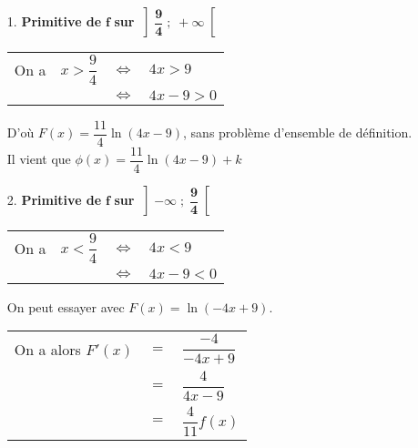 \begin{itemize}
\item[1.] \textbf{Primitive de} $\mathbf{f}$ \textbf{sur} $\mathbf{\left]\dfrac{9}{4} \; ; \; +\infty\right[}$ \\

\begin{tabular}{llll}
\hspace*{-.3cm} On a & $x > \dfrac{9}{4}$ & $\Longleftrightarrow$ & $4x > 9$ \vspace*{.3cm} \\
& & $\Longleftrightarrow$ & $4x - 9 > 0$ \vspace*{.3cm} \\
\end{tabular}

D'où $F(x) = \dfrac{11}{4}\ln\left(4x-9\right)$, sans problème d'ensemble de définition. \\

Il vient que $\phi\left(x\right) = \dfrac{11}{4}\ln\left(4x-9\right) + k$ \\

\item[2.] \textbf{Primitive de} $\mathbf{f}$ \textbf{sur} $\mathbf{\left]-\infty \; ; \; \dfrac{9}{4}\right[}$ \\

\begin{tabular}{llll}
\hspace*{-.3cm} On a & $x < \dfrac{9}{4}$ & $\Longleftrightarrow$ & $4x < 9$ \vspace*{.3cm} \\
& & $\Longleftrightarrow$ & $4x - 9 < 0$ \vspace*{.3cm} \\
\end{tabular}

On peut essayer avec $F(x) = \ln\left(-4x+9\right)$. \\

\begin{tabular}{lll}
\hspace*{-.3cm} On a alors $F'(x)$ & $=$ & $ \dfrac{-4}{-4x+9}$ \vspace*{.3cm} \\
& $=$ & $ \dfrac{4}{4x-9}$ \vspace*{.3cm} \\
& $=$ & $\dfrac{4}{11}f\left(x\right)$ \\
\end{tabular}

\vspace*{.3cm}


\end{itemize}
